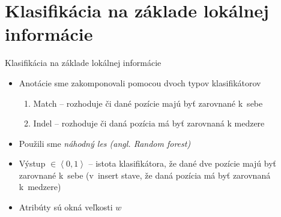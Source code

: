 \documentclass[xcolor=dvipsnames, compress, 12pt]{beamer}
\theoremstyle{definition}
\begin{document}


\section{Klasifikácia na základe lokálnej informácie}

\begin{frame}{Klasifikácia na základe lokálnej informácie}
\begin{itemize}
  \item Anotácie sme zakomponovali pomocou dvoch typov klasifikátorov
  \begin{enumerate}
    \item Match -- rozhoduje či dané pozície majú byť zarovnané k~sebe
    \item Indel -- rozhoduje či daná pozícia má byť zarovnaná k medzere
  \end{enumerate}
  \item Použili sme \emph{náhodný les (angl. Random forest)} \cite{randomForestPaper}
  \item Výstup $\in \left<0,1\right>$ -- istota klasifikátora, že dané dve pozície majú byť zarovnané k~sebe (v~insert stave, že daná pozícia má  byť zarovnaná k~medzere)
  \item Atribúty sú okná veľkosti $w$
\end{itemize}
\end{frame}
\end{document}
